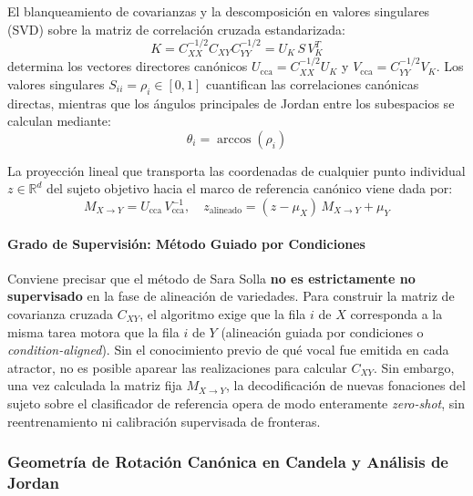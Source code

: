 \documentclass[11pt,a4paper]{article}
\begin{document}
El blanqueamiento de covarianzas y la descomposición en valores singulares (SVD) sobre la matriz de correlación cruzada estandarizada:
\begin{equation}
    K = C_{XX}^{-1/2} C_{XY} C_{YY}^{-1/2} = U_K \, S \, V_K^T
\end{equation}
determina los vectores directores canónicos $U_{\text{cca}} = C_{XX}^{-1/2} U_K$ y $V_{\text{cca}} = C_{YY}^{-1/2} V_K$. Los valores singulares $S_{ii} = \rho_i \in [0, 1]$ cuantifican las correlaciones canónicas directas, mientras que los ángulos principales de Jordan entre los subespacios se calculan mediante:
\begin{equation}
    \theta_i = \arccos(\rho_i)
\end{equation}

La proyección lineal que transporta las coordenadas de cualquier punto individual $z \in \mathbb{R}^d$ del sujeto objetivo hacia el marco de referencia canónico viene dada por:
\begin{equation}
    M_{X \to Y} = U_{\text{cca}} \, V_{\text{cca}}^{-1}, \quad z_{\text{alineado}} = (z - \mu_X) \, M_{X \to Y} + \mu_Y
\end{equation}

\paragraph{Grado de Supervisión: Método Guiado por Condiciones}
Conviene precisar que el método de Sara Solla \textbf{no es estrictamente no supervisado} en la fase de alineación de variedades. Para construir la matriz de covarianza cruzada $C_{XY}$, el algoritmo exige que la fila $i$ de $X$ corresponda a la misma tarea motora que la fila $i$ de $Y$ (alineación guiada por condiciones o \textit{condition-aligned}). Sin el conocimiento previo de qué vocal fue emitida en cada atractor, no es posible aparear las realizaciones para calcular $C_{XY}$. Sin embargo, una vez calculada la matriz fija $M_{X \to Y}$, la decodificación de nuevas fonaciones del sujeto sobre el clasificador de referencia opera de modo enteramente \textit{zero-shot}, sin reentrenamiento ni calibración supervisada de fronteras.

\subsubsection{Geometría de Rotación Canónica en Candela y Análisis de Jordan}
\label{subsubsec:geometria_candela_jordan}
\end{document}
